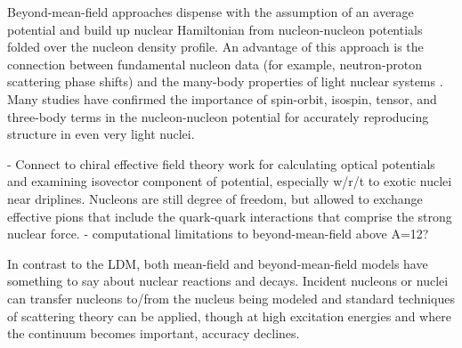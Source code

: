 
Beyond-mean-field approaches dispense with the assumption of an average
potential and build up nuclear Hamiltonian from nucleon-nucleon potentials
folded over the nucleon density profile. An advantage
of this approach is the connection between fundamental nucleon data
(for example, neutron-proton scattering phase shifts) and the many-body
properties of light nuclear systems \cite{AV18}. Many studies have
confirmed the importance of spin-orbit, isospin, tensor, and three-body terms
in the nucleon-nucleon potential for accurately reproducing structure in even
very light nuclei. 

- Connect to chiral effective field theory work for calculating optical potentials
and examining isovector component of potential, especially w/r/t to exotic
nuclei near driplines. Nucleons are still degree of freedom, but allowed to exchange effective 
pions that include the quark-quark interactions that comprise the strong nuclear force.
- computational limitations to beyond-mean-field above A=12?

In contrast to the LDM, both mean-field and beyond-mean-field models have
something to say about nuclear reactions and decays. Incident nucleons or nuclei can
transfer nucleons to/from the nucleus being modeled and standard
techniques of scattering theory can be applied, though at high excitation
energies and where the continuum becomes important, accuracy declines.

